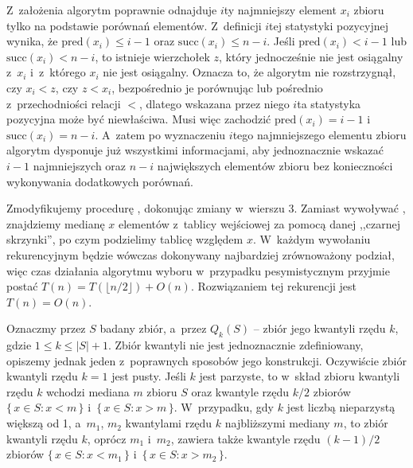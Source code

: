 Z~założenia algorytm poprawnie odnajduje $i$\nbhyphen ty najmniejszy element $x_i$ zbioru tylko na podstawie porównań elementów.
Z~definicji $i$\nbhyphen tej statystyki pozycyjnej wynika, że $\mathrm{pred}(x_i)\le i-1$ oraz $\mathrm{succ}(x_i)\le n-i$.
Jeśli $\mathrm{pred}(x_i)<i-1$ lub $\mathrm{succ}(x_i)<n-i$, to istnieje wierzchołek $z$, który jednocześnie nie jest osiągalny z~$x_i$ i~z~którego $x_i$ nie jest osiągalny.
Oznacza to, że algorytm nie rozstrzygnął, czy $x_i<z$, czy $z<x_i$, bezpośrednio je porównując lub pośrednio z~przechodniości relacji $<$, dlatego wskazana przez niego $i$\nbhyphen ta statystyka pozycyjna może być niewłaściwa.
Musi więc zachodzić $\mathrm{pred}(x_i)=i-1$ i~$\mathrm{succ}(x_i)=n-i$.
A~zatem po wyznaczeniu $i$\nbhyphen tego najmniejszego elementu zbioru algorytm dysponuje już wszystkimi informacjami, aby jednoznacznie wskazać $i-1$ najmniejszych oraz $n-i$ największych elementów zbioru bez konieczności wykonywania dodatkowych porównań.

\exercise %
Zmodyfikujemy procedurę , dokonując zmiany w~wierszu 3.
Zamiast wywoływać , znajdziemy medianę $x$ elementów z~tablicy wejściowej za pomocą danej ,,czarnej skrzynki'', po czym podzielimy tablicę względem $x$.
W~każdym wywołaniu rekurencyjnym będzie wówczas dokonywany najbardziej zrównoważony podział, więc czas działania algorytmu wyboru w~przypadku pesymistycznym przyjmie postać $T(n)=T(\lfloor n/2\rfloor)+O(n)$.
Rozwiązaniem tej rekurencji jest $T(n)=O(n)$.

\exercise %
Oznaczmy przez $S$ badany zbiór, a~przez $Q_k(S)$ -- zbiór jego kwantyli rzędu $k$, gdzie $1\le k\le|S|+1$.
Zbiór kwantyli nie jest jednoznacznie zdefiniowany, opiszemy jednak jeden z~poprawnych sposobów jego konstrukcji.
Oczywiście zbiór kwantyli rzędu $k=1$ jest pusty.
Jeśli $k$ jest parzyste, to w~skład zbioru kwantyli rzędu $k$ wchodzi mediana $m$ zbioru $S$ oraz kwantyle rzędu $k/2$ zbiorów $\{\,x\in S:x<m\,\}$ i~$\{\,x\in S:x>m\,\}$.
W~przypadku, gdy $k$ jest liczbą nieparzystą większą od 1, a~$m_1$, $m_2$ kwantylami rzędu $k$ najbliższymi mediany $m$, to zbiór kwantyli rzędu $k$, oprócz $m_1$ i~$m_2$, zawiera także kwantyle rzędu $(k-1)/2$ zbiorów $\{\,x\in S:x<m_1\,\}$ i~$\{\,x\in S:x>m_2\,\}$.


